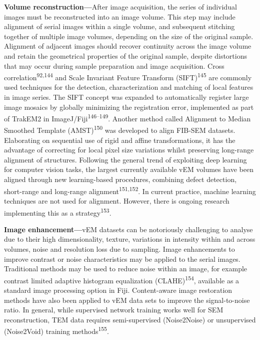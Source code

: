 \documentclass{article}
\begin{document}
\textbf{Volume reconstruction—}After image acquisition, the series of individual images must be reconstructed into an image volume. This step may include alignment of serial images within a single volume, and subsequent stitching together of multiple image volumes, depending on the size of the original sample. Alignment of adjacent images should recover continuity across the image volume and retain the geometrical properties of the original sample, despite distortions that may occur during sample preparation and image acquisition. Cross correlation\textsuperscript{92,144} and Scale Invariant Feature Transform (SIFT)\textsuperscript{145} are commonly used techniques for the detection, characterization and matching of local features in image series. The SIFT concept was expanded to automatically register large image mosaics by globally minimizing the registration error, implemented as part of TrakEM2 in ImageJ/Fiji\textsuperscript{146–149}. Another method called Alignment to Median Smoothed Template (AMST)\textsuperscript{150} was developed to align FIB-SEM datasets. Elaborating on sequential use of rigid and affine transformations, it has the advantage of correcting for local pixel size variations whilst preserving long-range alignment of structures. Following the general trend of exploiting deep learning for computer vision tasks, the largest currently available vEM volumes have been aligned through new learning-based procedures, combining defect detection, short-range and long-range alignment\textsuperscript{151,152}. In current practice, machine learning techniques are not used for alignment. However, there is ongoing research implementing this as a strategy\textsuperscript{153}.

\textbf{Image enhancement—}vEM datasets can be notoriously challenging to analyse due to their high dimensionality, texture, variations in intensity within and across volumes, noise and resolution loss due to sampling. Image enhancements to improve contrast or noise characteristics may be applied to the serial images. Traditional methods may be used to reduce noise within an image, for example contrast limited adaptive histogram equalization (CLAHE)\textsuperscript{154}, available as a standard image processing option in Fiji. Content-aware image restoration methods have also been applied to vEM data sets to improve the signal-to-noise ratio. In general, while supervised network training works well for SEM reconstruction, TEM data requires semi-supervised (Noise2Noise) or unsupervised (Noise2Void) training methods\textsuperscript{155}.
\end{document}
